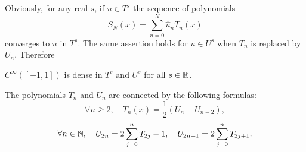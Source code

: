 \documentclass[a4paper]{article}
\begin{document}
Obviously, for any real $s$, if $u \in T^s$ the sequence of polynomials 
\[S_N(x) = \sum_{n=0}^{N} \hat{u}_n T_n(x)\]
converges to $u$ in $T^s$. The same assertion holds for $u \in U^s$ when $T_n$ is replaced by $U_n$. Therefore
\begin{Lem}
	\label{densite}
	$C^{\infty}([-1,1])$ is dense in $T^s$ and $U^s$ for all $s \in \mathbb{R}$.
\end{Lem}
\noindent The polynomials $T_n$ and $U_n$ are connected by the following formulas:
\begin{equation}
\label{TnAsUn}
\forall n \geq 2, \quad T_n(x) = \frac{1}{2}\left(U_n - U_{n-2}\right),
\end{equation}
\begin{equation}
\label{UnAsTn}
\forall n \in \mathbb{N}, \quad U_{2n} = 2\sum_{j = 0}^n T_{2j} - 1, \quad U_{2n+1} = 2\sum_{j=0}^n T_{2j+1}.
\end{equation}
\end{document}
